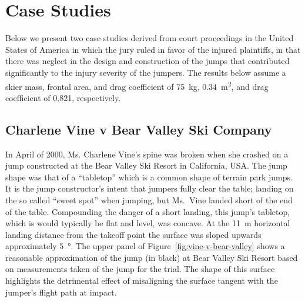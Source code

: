 \documentclass{article}
\begin{document}
\section{Case Studies}
%
Below we present two case studies derived from court proceedings in the United
States of America in which the jury ruled in favor of the injured plaintiffs,
in that there was neglect in the design and construction of the jumps that
contributed significantly to the injury severity of the jumpers. The results
below assume a skier mass, frontal area, and drag coefficient of 75~\si{\kg},
0.34~\si{\meter\squared}, and drag coefficient of 0.821, respectively.

\subsection{Charlene Vine v Bear Valley Ski Company}
%
In April of 2000, Ms. Charlene Vine's spine was broken when she crashed on a
jump constructed at the Bear Valley Ski Resort in California, USA. The jump
shape was that of a ``tabletop'' which is a common shape of terrain park jumps.
It is the jump constructor's intent that jumpers fully clear the table; landing
on the so called ``sweet spot'' when jumping, but Ms.~Vine landed short of the
end of the table.
Compounding the danger of a short landing, this jump's tabletop, which is
would typically be flat and level, was concave.
At the 11~\si{\meter} horizontal landing distance from the takeoff point the surface
was sloped upwards approximately 5~\si{\degree}.
The upper panel of Figure~\ref{fig:vine-v-bear-valley} shows a reasonable
approximation of the jump (in black) at Bear Valley Ski Resort based on
measurements taken of the jump for the trial.
The shape of this surface highlights the detrimental effect of misaligning the
surface tangent with the jumper's flight path at impact.
%
\end{document}
